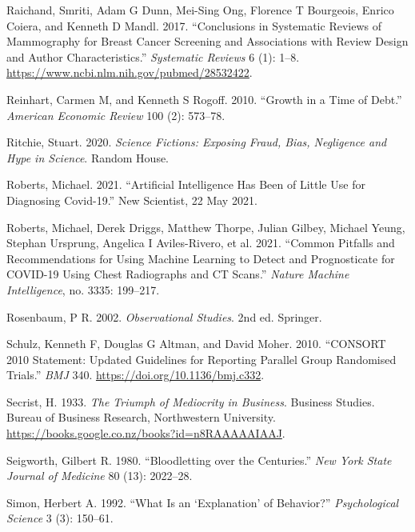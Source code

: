 \documentclass[
  10ptls,
  b5paper]{book}
\newlength{\cslhangindent}
\newenvironment{CSLReferences}[2] %
 {\begin{list}{}{%
  \setlength{\itemindent}{0pt}
  \setlength{\leftmargin}{0pt}
  \setlength{\parsep}{0pt}
  \ifodd #1
   \setlength{\leftmargin}{\cslhangindent}
   \setlength{\itemindent}{-1\cslhangindent}
  \fi
  \setlength{\itemsep}{#2\baselineskip}}}
 {\end{list}}
\begin{document}
\begin{CSLReferences}{1}{0}
Raichand, Smriti, Adam G Dunn, Mei-Sing Ong, Florence T Bourgeois, Enrico Coiera, and Kenneth D Mandl. 2017. {``Conclusions in Systematic Reviews of Mammography for Breast Cancer Screening and Associations with Review Design and Author Characteristics.''} \emph{Systematic Reviews} 6 (1): 1--8. \url{https://www.ncbi.nlm.nih.gov/pubmed/28532422}.

Reinhart, Carmen M, and Kenneth S Rogoff. 2010. {``Growth in a Time of Debt.''} \emph{American Economic Review} 100 (2): 573--78.

Ritchie, Stuart. 2020. \emph{Science Fictions: Exposing Fraud, Bias, Negligence and Hype in Science}. Random House.

Roberts, Michael. 2021. {``Artificial Intelligence Has Been of Little Use for Diagnosing Covid-19.''} New Scientist, 22 May 2021.

Roberts, Michael, Derek Driggs, Matthew Thorpe, Julian Gilbey, Michael Yeung, Stephan Ursprung, Angelica I Aviles-Rivero, et al. 2021. {``Common Pitfalls and Recommendations for Using Machine Learning to Detect and Prognosticate for COVID-19 Using Chest Radiographs and CT Scans.''} \emph{Nature Machine Intelligence}, no. 3335: 199--217.

Rosenbaum, P R. 2002. \emph{Observational Studies}. 2nd ed. Springer.

Schulz, Kenneth F, Douglas G Altman, and David Moher. 2010. {``CONSORT 2010 Statement: Updated Guidelines for Reporting Parallel Group Randomised Trials.''} \emph{BMJ} 340. \url{https://doi.org/10.1136/bmj.c332}.

Secrist, H. 1933. \emph{The Triumph of Mediocrity in Business}. Business Studies. Bureau of Business Research, Northwestern University. \url{https://books.google.co.nz/books?id=n8RAAAAAIAAJ}.

Seigworth, Gilbert R. 1980. {``Bloodletting over the Centuries.''} \emph{New York State Journal of Medicine} 80 (13): 2022--28.

Simon, Herbert A. 1992. {``What Is an {`Explanation'} of Behavior?''} \emph{Psychological Science} 3 (3): 150--61.


\end{CSLReferences}
\end{document}
